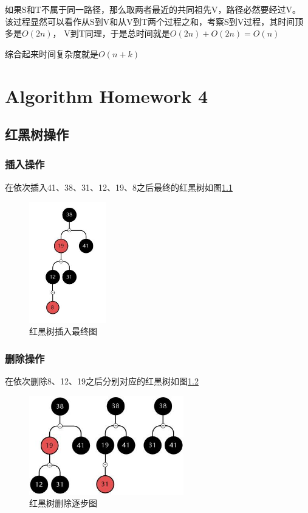 \documentclass[cn,11pt,chinese]{elegantbook}
\begin{document}
如果S和T不属于同一路径，那么取两者最近的共同祖先V，路径必然要经过V。
该过程显然可以看作从S到V和从V到T两个过程之和，考察S到V过程，其时间顶多是$O (2n)$，
V到T同理，于是总时间就是$O (2n) + O (2n) = O (n)$

综合起来时间复杂度就是$O (n+k)$

\chapter{Algorithm Homework 4}

\section{红黑树操作}

\subsection{插入操作}
在依次插入41、38、31、12、19、8之后最终的红黑树如图\ref{Ch4S1_1}
\begin{figure}[htbp]
	\centering
	\includegraphics[width=0.3\textwidth]{image/Ch4S1_1.jpg}
	\caption{红黑树插入最终图}
  \label{Ch4S1_1}
\end{figure}

\subsection{删除操作}
在依次删除8、12、19之后分别对应的红黑树如图\ref{Ch4S1_2}
\begin{figure}[htbp]
	\centering
	\includegraphics[width=0.6\textwidth]{image/Ch4S1_2.jpg}
	\caption{红黑树删除逐步图}
  \label{Ch4S1_2}
\end{figure}
\end{document}
